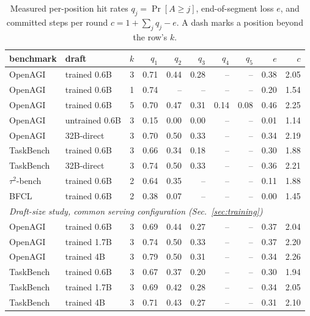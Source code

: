 \begin{table}[h]
\centering
\small
\caption{Measured per-position hit rates $q_j = \Pr[A \ge j]$, end-of-segment
loss $e$, and committed steps per round $c = 1 + \sum_j q_j - e$. A dash marks a position beyond the row's $k$.}
\label{tab:qj}
\begin{tabular}{llrrrrrrrr}
\toprule
benchmark & draft & $k$ & $q_1$ & $q_2$ & $q_3$ & $q_4$ & $q_5$ & $e$ & $c$ \\
\midrule
OpenAGI   & trained 0.6B   & 3 & 0.71 & 0.44 & 0.28 & --   & --   & 0.38 & 2.05 \\
OpenAGI   & trained 0.6B   & 1 & 0.74 & --   & --   & --   & --   & 0.20 & 1.54 \\
OpenAGI   & trained 0.6B   & 5 & 0.70 & 0.47 & 0.31 & 0.14 & 0.08 & 0.46 & 2.25 \\
OpenAGI   & untrained 0.6B & 3 & 0.15 & 0.00 & 0.00 & --   & --   & 0.01 & 1.14 \\
OpenAGI   & 32B-direct     & 3 & 0.70 & 0.50 & 0.33 & --   & --   & 0.34 & 2.19 \\
TaskBench & trained 0.6B   & 3 & 0.66 & 0.34 & 0.18 & --   & --   & 0.30 & 1.88 \\
TaskBench & 32B-direct     & 3 & 0.74 & 0.50 & 0.33 & --   & --   & 0.36 & 2.21 \\
$\tau^2$-bench   & trained 0.6B   & 2 & 0.64 & 0.35 & --   & --   & --   & 0.11 & 1.88 \\
BFCL      & trained 0.6B   & 2 & 0.38 & 0.07 & --   & --   & --   & 0.00 & 1.45 \\
\midrule
\multicolumn{10}{l}{\emph{Draft-size study, common serving configuration (Sec.~\ref{sec:training})}} \\
OpenAGI   & trained 0.6B   & 3 & 0.69 & 0.44 & 0.27 & --   & --   & 0.37 & 2.04 \\
OpenAGI   & trained 1.7B   & 3 & 0.74 & 0.50 & 0.33 & --   & --   & 0.37 & 2.20 \\
OpenAGI   & trained 4B     & 3 & 0.79 & 0.50 & 0.31 & --   & --   & 0.34 & 2.26 \\
TaskBench & trained 0.6B   & 3 & 0.67 & 0.37 & 0.20 & --   & --   & 0.30 & 1.94 \\
TaskBench & trained 1.7B   & 3 & 0.69 & 0.42 & 0.28 & --   & --   & 0.34 & 2.05 \\
TaskBench & trained 4B     & 3 & 0.71 & 0.43 & 0.27 & --   & --   & 0.31 & 2.10 \\
\bottomrule
\end{tabular}
\end{table}

